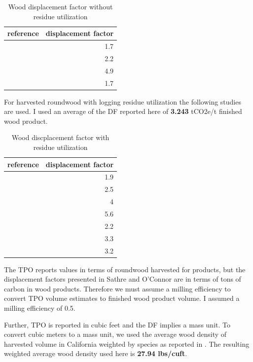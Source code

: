 \documentclass[a4paper]{article}
\begin{document}
\begin{table}[htb]
\caption{Wood displacement factor without residue utilization \label{tab:df_no_use}}
\centering
\begin{tabular}{lr}
reference & displacement factor\\
\hline
\citet{Eriksson2007} & 1.7\\
\citet{Eriksson2007} & 2.2\\
\citet{Salazar2009} & 4.9\\
\citet{Werner2005} & 1.7\\
\end{tabular}
\end{table}

For harvested roundwood with logging residue utilization the following
studies are used. I used an average of the DF reported here of \textbf{3.243} tCO2e/t finished
wood product.


\begin{table}[htb]
\caption{Wood discplacement factor with residue utilization \label{tab:df_inc_use}}
\centering
\begin{tabular}{lr}
reference & displacement factor\\
\hline
\citet{Eriksson2007} & 1.9\\
\citet{Eriksson2007} & 2.5\\
\citet{Gustavsson2006a} & 4\\
\citet{Gustavsson2006a} & 5.6\\
\citet{Gustavsson2006a} & 2.2\\
\citet{Gustavsson2006a} & 3.3\\
\citet{Pingoud2001} & 3.2\\
\end{tabular}
\end{table}



The TPO reports values in terms of roundwood harvested for products, but the
displacement factors presented in Sathre and O'Connor are in terms of
tons of carbon in wood products. Therefore we must assume a milling
efficiency to convert TPO volume estimates to finished wood product volume. I assumed
a milling efficiency of 0.5.


Further, TPO is reported in cubic feet and the DF implies a mass
unit. To convert cubic meters to a mass unit, we used the average wood
density of harvested volume in California weighted by species as reported 
in \citet{Mciver2012}. The resulting weighted average wood density used here is \textbf{27.94
lbs/cuft}.
\end{document}
